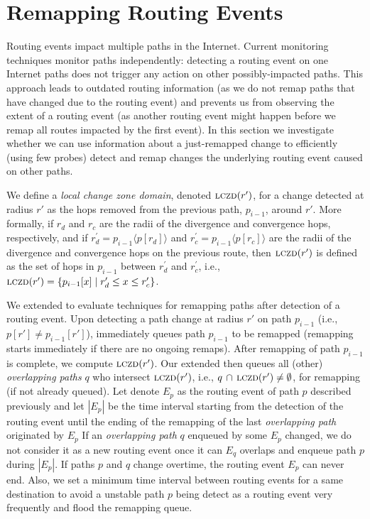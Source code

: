 \section{Remapping Routing Events}
\label{sec:patching}

Routing events impact multiple paths in the Internet. Current
monitoring techniques monitor paths independently: detecting
a routing event on one Internet paths does not trigger any action on
other possibly-impacted paths.  This approach leads to outdated
routing information (as we do not remap paths that have 
changed due to the routing event) and prevents us from
observing the extent of a routing event (as another routing event
might happen before we remap all routes impacted by the first event).
In this section we investigate whether we can use information about
a just-remapped change to efficiently (using few probes) detect and remap changes the
underlying routing event caused on other paths.  


\newcommand{\lczd}{\ensuremath\mathrm{\textsc{lczd}}}

We define a \emph{local change zone domain}, denoted $\lczd(r')$,
for a change detected at radius $r'$ as the hops removed from the
previous path, $p_{i-1}$, around $r'$. More formally, if $r_d$ and
$r_c$ are the radii of the divergence and convergence hops,
respectively, and if $r^\prime_d = p_{i-1}\langle p[r_d]\rangle$ and
$r^\prime_c = p_{i-1}\langle p[r_c]\rangle$ are the radii of the
divergence and convergence hops on the previous route, then
$\lczd(r')$ is defined as the set of hops in $p_{i-1}$ between
$r^\prime_d$ and $r^\prime_c$, i.e., $\lczd(r') = \{p_{i-1}[x]
\mid{} r^\prime_d \le x \le r^\prime_c\}$.

We extended \dtrack{} to evaluate techniques for remapping paths
after detection of a routing event.  Upon detecting a path change at
radius $r'$ on path $p_{i-1}$ (i.e., $p[r'] \ne p_{i-1}[r']$),
\dtrack{} immediately queues path $p_{i-1}$ to be remapped
(remapping starts immediately if there are no ongoing remaps).
After remapping of path $p_{i-1}$ is complete, we compute
$\lczd(r')$. Our extended \dtrack{} then queues all (other)
\emph{overlapping paths} $q$ who intersect $\lczd(r')$, i.e., $q\,
\cap\,\lczd(r') \ne \emptyset$, for remapping (if not already queued).
Let denote $E_p$ as the routing event of path $p$ described previously
and let $|E_p|$ be the time interval starting from the detection of the routing event
until the ending of the remapping of the last \emph{overlapping path}
originated by $E_p$
If an \emph{overlapping path} $q$ enqueued by some $E_p$ changed, we do not consider
it as a new routing event once it can $E_q$ overlaps and enqueue path $p$ during
$|E_p|$. If paths $p$ and $q$ change overtime, the routing event $E_p$ can never
end. Also, we set a minimum time interval between routing events for a same
destination to avoid a unstable path $p$ being detect as a routing event very
frequently and flood the remapping queue.

